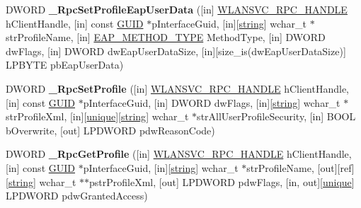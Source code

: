 \begin{DoxyCompactItemize}
\item 
\mbox{\label{interfacewlansvc__interface_ab35c655d07330f514adf8ae93bc90623}} 
D\+W\+O\+RD {\bfseries \+\_\+\+Rpc\+Set\+Profile\+Eap\+User\+Data} (\mbox{[}in\mbox{]} \hyperlink{interfacevoid}{W\+L\+A\+N\+S\+V\+C\+\_\+\+R\+P\+C\+\_\+\+H\+A\+N\+D\+LE} h\+Client\+Handle, \mbox{[}in\mbox{]} const \hyperlink{interface_g_u_i_d}{G\+U\+ID} $\ast$p\+Interface\+Guid, \mbox{[}in\mbox{]}\mbox{[}\hyperlink{structstring}{string}\mbox{]} wchar\+\_\+t $\ast$str\+Profile\+Name, \mbox{[}in\mbox{]} \hyperlink{struct___e_a_p___m_e_t_h_o_d___t_y_p_e}{E\+A\+P\+\_\+\+M\+E\+T\+H\+O\+D\+\_\+\+T\+Y\+PE} Method\+Type, \mbox{[}in\mbox{]} D\+W\+O\+RD dw\+Flags, \mbox{[}in\mbox{]} D\+W\+O\+RD dw\+Eap\+User\+Data\+Size, \mbox{[}in\mbox{]}\mbox{[}size\+\_\+is(dw\+Eap\+User\+Data\+Size)\mbox{]} L\+P\+B\+Y\+TE pb\+Eap\+User\+Data)
\item 
\mbox{\label{interfacewlansvc__interface_abb09315a5c8bf373ac7e9d5860d1f825}} 
D\+W\+O\+RD {\bfseries \+\_\+\+Rpc\+Set\+Profile} (\mbox{[}in\mbox{]} \hyperlink{interfacevoid}{W\+L\+A\+N\+S\+V\+C\+\_\+\+R\+P\+C\+\_\+\+H\+A\+N\+D\+LE} h\+Client\+Handle, \mbox{[}in\mbox{]} const \hyperlink{interface_g_u_i_d}{G\+U\+ID} $\ast$p\+Interface\+Guid, \mbox{[}in\mbox{]} D\+W\+O\+RD dw\+Flags, \mbox{[}in\mbox{]}\mbox{[}\hyperlink{structstring}{string}\mbox{]} wchar\+\_\+t $\ast$str\+Profile\+Xml, \mbox{[}in\mbox{]}\mbox{[}\hyperlink{interfaceunique}{unique}\mbox{]}\mbox{[}\hyperlink{structstring}{string}\mbox{]} wchar\+\_\+t $\ast$str\+All\+User\+Profile\+Security, \mbox{[}in\mbox{]} B\+O\+OL b\+Overwrite, \mbox{[}out\mbox{]} L\+P\+D\+W\+O\+RD pdw\+Reason\+Code)
\item 
\mbox{\label{interfacewlansvc__interface_a73a54098f45066b3219cead8a76ded37}} 
D\+W\+O\+RD {\bfseries \+\_\+\+Rpc\+Get\+Profile} (\mbox{[}in\mbox{]} \hyperlink{interfacevoid}{W\+L\+A\+N\+S\+V\+C\+\_\+\+R\+P\+C\+\_\+\+H\+A\+N\+D\+LE} h\+Client\+Handle, \mbox{[}in\mbox{]} const \hyperlink{interface_g_u_i_d}{G\+U\+ID} $\ast$p\+Interface\+Guid, \mbox{[}in\mbox{]}\mbox{[}\hyperlink{structstring}{string}\mbox{]} wchar\+\_\+t $\ast$str\+Profile\+Name, \mbox{[}out\mbox{]}\mbox{[}ref\mbox{]}\mbox{[}\hyperlink{structstring}{string}\mbox{]} wchar\+\_\+t $\ast$$\ast$pstr\+Profile\+Xml, \mbox{[}out\mbox{]} L\+P\+D\+W\+O\+RD pdw\+Flags, \mbox{[}in, out\mbox{]}\mbox{[}\hyperlink{interfaceunique}{unique}\mbox{]} L\+P\+D\+W\+O\+RD pdw\+Granted\+Access)
$$
\end{DoxyCompactItemize}
